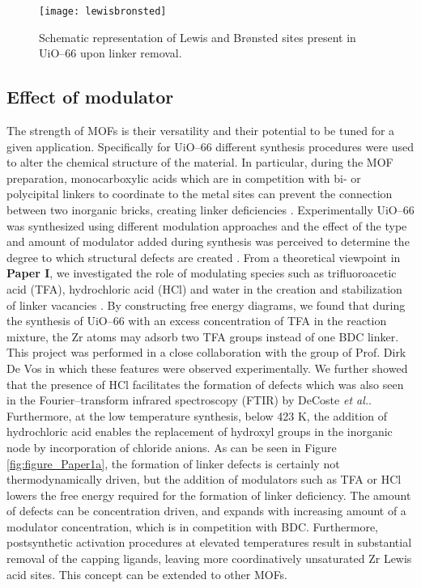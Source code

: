 \begin{figure}[!h]
	\centering
	\texttt{[image: lewisbronsted]}
	\caption{Schematic representation of Lewis and Br\o{}nsted sites present in
	UiO--66 upon linker removal.}
	\label{fig:lewisbronsted}
\end{figure}

\newpage
\subsection*{Effect of modulator}
The strength of MOFs is their versatility and their potential to be tuned for a
given application. Specifically for UiO--66 different synthesis procedures were
used to alter the chemical structure of the material. In
particular, during the MOF preparation, monocarboxylic acids which are in
competition with bi- or polycipital linkers to coordinate to the metal sites can
prevent the connection between two inorganic bricks, creating linker
deficiencies \cite{Vermoortele2013}.
Experimentally UiO--66 was synthesized using different modulation approaches and the effect of the type and amount of modulator added during synthesis was perceived to determine the degree to which structural defects are created \cite{Vermoortele2013, Shearer2016, Cliffe2014, Morris2017mod}. From a theoretical viewpoint in
\textbf{Paper I}, we investigated the role of modulating species such as
trifluoroacetic acid (TFA), hydrochloric acid (HCl) and water in the creation and stabilization of linker vacancies \cite{Vandichel2015}. By constructing free energy diagrams, we found that during the synthesis of UiO--66 with an excess concentration of TFA in the reaction mixture, the Zr atoms may adsorb two TFA groups instead of one BDC linker. This
project was performed in a close collaboration with the group of Prof. Dirk De
Vos in which these features were observed experimentally. We further showed that
the presence of HCl facilitates the formation of defects which was also seen in
the Fourier--transform infrared spectroscopy (FTIR) by DeCoste \textit{et
al.}\cite{DeCoste2013}. Furthermore, at the low temperature synthesis, below 423
K, the addition of hydrochloric acid enables the replacement of hydroxyl groups
in the inorganic node by incorporation of chloride anions. As can be seen in
Figure \ref{fig:figure_Paper1a}, the formation of linker defects is certainly not thermodynamically driven, but the addition of modulators such as TFA or HCl lowers the free energy required for the formation of linker deficiency. The amount of defects can be
concentration driven, and expands with increasing amount of a modulator
concentration, which is in competition with BDC. Furthermore, postsynthetic
activation procedures at elevated temperatures result in substantial removal of the capping ligands,
leaving more coordinatively unsaturated Zr Lewis acid sites. This concept can be
extended to other MOFs.


